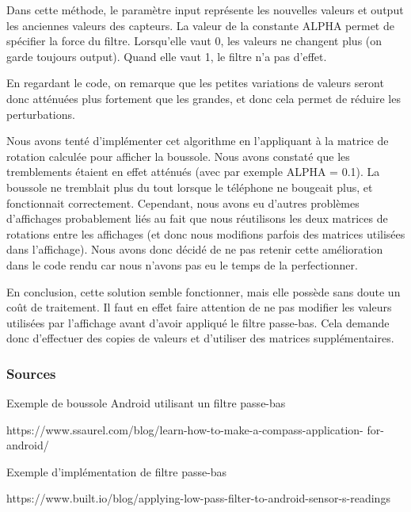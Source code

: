 \documentclass[francais,12pt]{article}
\begin{document}
	Dans cette méthode, le paramètre input représente les nouvelles valeurs et output les anciennes valeurs des capteurs. La valeur de la constante ALPHA permet de spécifier la force du filtre. Lorsqu'elle vaut 0, les valeurs ne changent plus (on garde toujours output). Quand elle vaut 1, le filtre n'a pas d'effet.
	
	En regardant le code, on remarque que les petites variations de valeurs seront donc atténuées plus fortement que les grandes, et donc cela permet de réduire les perturbations.
	
	Nous avons tenté d'implémenter cet algorithme en l'appliquant à la matrice de rotation calculée pour afficher la boussole. Nous avons constaté que les tremblements étaient en effet atténués (avec par exemple ALPHA = 0.1). La boussole ne tremblait plus du tout lorsque le téléphone ne bougeait plus, et fonctionnait correctement. Cependant, nous avons eu d'autres problèmes d'affichages probablement liés au fait que nous réutilisons les deux matrices de rotations entre les affichages (et donc nous modifions parfois des matrices utilisées dans l'affichage). Nous avons donc décidé de ne pas retenir cette amélioration dans le code rendu car nous n'avons pas eu le temps de la perfectionner.
	
	En conclusion, cette solution semble fonctionner, mais elle possède sans doute un coût de traitement. Il faut en effet faire attention de ne pas modifier les valeurs utilisées par l'affichage avant d'avoir appliqué le filtre passe-bas. Cela demande donc d'effectuer des copies de valeurs et d'utiliser des matrices supplémentaires. 
	
	\subsubsection*{Sources}
	Exemple de boussole Android utilisant un filtre passe-bas
	
	https://www.ssaurel.com/blog/learn-how-to-make-a-compass-application-
		for-android/
	
	Exemple d'implémentation de filtre passe-bas
	
	https://www.built.io/blog/applying-low-pass-filter-to-android-sensor-s-readings
	
	
\end{document}
